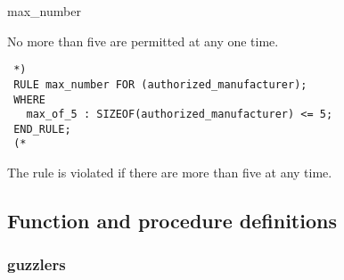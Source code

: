 \documentclass{article}
\begin{document}
 \begin{Mnamedesc}{max_number}

 \begin{Mdesctext}

 No more than five  are permitted at any one
 time.

 \end{Mdesctext}

 \begin{Mexp}
 \begin{verbatim}
 *)
 RULE max_number FOR (authorized_manufacturer);
 WHERE
   max_of_5 : SIZEOF(authorized_manufacturer) <= 5;
 END_RULE;
 (*
 \end{verbatim}
 \end{Mexp}

 \begin{Mprops}

 \item[max\_of\_5:] The rule is violated if there are more than five
  at any time.

 \end{Mprops}

 \end{Mnamedesc}


 \subsection{Function and procedure definitions}

 \subsubsection{guzzlers}
\end{document}
